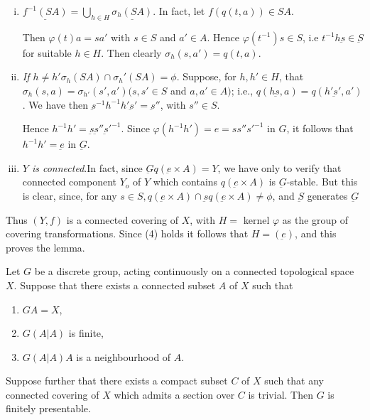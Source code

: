 \begin{enumerate}[(i)]
\item $\underline{ f^{-1} (SA)} = \bigcup \limits_{h \in H}
  \underline{\sigma_h (SA)}$. In fact, let $f(q(t,a)) \in SA$.  
  
  Then $\varphi (t) a = sa'$ with $s \in S$ and $a' \in A$. Hence
  $\varphi(t^{-1}) s \in S$, i.e $t^{-1}h \underbar{s} \in
  \underbar{S}$ for suitable $h \in H$. Then clearly $\sigma_h
  (s,a')=q(t,a)$. 
\item \textit{If $h \neq h' \sigma_h (SA) \cap \sigma_h' (SA)= \phi
  $}. Suppose, for $h, h' \in H$, that $\sigma_h (s,a)=
  \sigma_{h'} (s', a')(s,s' \in S$ and $a, a' \in A)$; i.e., $q(h
  \underbar{s}, a) = q(h' \underbar{s}', a')$. We have then
  $\underbar{s}^{-1} h^{-1}h' \underbar{s}' = \underbar{s}''$, with $s''
  \in S$. 

  Hence $h^{-1} h' = \underbar{s} \underbar{s}''
  \underbar{s}'^{-1}$. Since $\varphi (h^{-1}h')=e=s s'' s'^{-1}$ in $G$,
  it follows that $h^{-1} h' =\underbar{e} $ in $\underbar{G}$. 

\item \textit{$Y$ is connected}.\pageoriginale In fact, since $\underbar{G} q
  (\underbar{e} \times A) =Y$, we have only to verify that connected
  component $Y_o$ of $Y$ which contains $q(\underbar{e} \times A) $ is
  $\underbar{G}$-stable. But this is clear, since, for any $s \in S,
  q(\underbar{e} \times A) \cap \underbar{s} q(\underbar{e} \times A)
  \neq \phi$, and $\underbar{S}$ generates $\underbar{G}$ 
\end{enumerate}

Thus $(Y,f)$ is a connected covering of $X$, with $H=$ kernel
$\varphi$ as the group of covering transformations. Since (4) holds
it follows that $H= (\underbar{e})$, and this proves the lemma. 

\setcounter{thm}{0}
\begin{thm}\label{chap3:thm1}%
  Let $G$ be a discrete group, acting continuously on a connected
  topological space $X$. Suppose that there exists a connected subset
  $A$ of $X$ such that  
  \begin{enumerate}[\rm(1)]
  \item $GA =X$,
  \item $G(A|A)$ is finite,
  \item $G(A|A)A$ is a neighbourhood of $A$.
  \end{enumerate}
  
  Suppose further that there exists a compact subset $C$ of $X$ such
  that any connected covering of $X$ which admits a section over $C$ is
  trivial. Then $G$ is finitely presentable. 
\end{thm}

